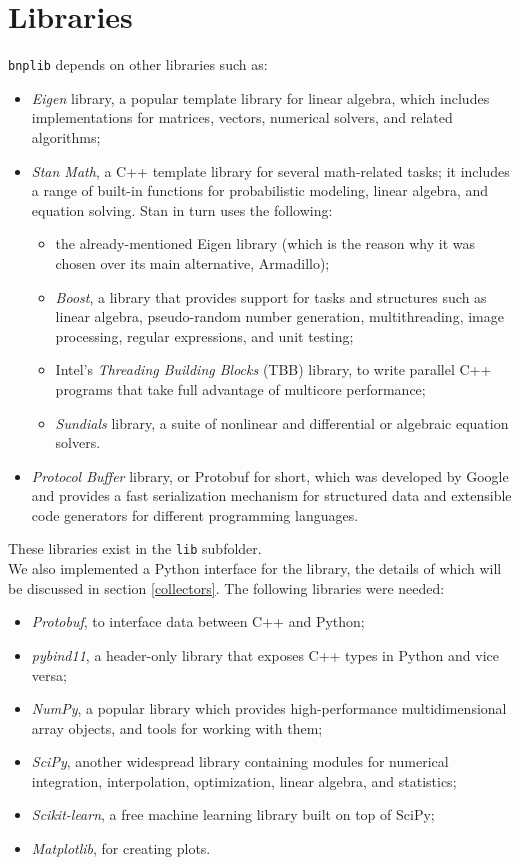 \section{Libraries}
\verb|bnplib| depends on other libraries such as:
\begin{itemize}
	\item \emph{Eigen} library, a popular template library for linear algebra, which includes implementations for matrices, vectors, numerical solvers, and related algorithms;
	\item \emph{Stan Math}, a C++ template library for several math-related tasks; it includes a range of built-in functions for probabilistic modeling, linear algebra, and equation solving.
	Stan in turn uses the following:
	\begin{itemize}
		\item the already-mentioned Eigen library (which is the reason why it was chosen over its main alternative, Armadillo);
		\item \emph{Boost}, a library that provides support for tasks and structures such as linear algebra, pseudo-random number generation, multithreading, image processing, regular expressions, and unit testing;
		\item Intel's \emph{Threading Building Blocks} (TBB) library, to write parallel C++ programs that take full advantage of multicore performance;
		\item \emph{Sundials} library, a suite of nonlinear and differential or algebraic equation solvers.
	\end{itemize}
	\item \emph{Protocol Buffer} library, or Protobuf for short, which was developed by Google and provides a fast serialization mechanism for structured data and extensible code generators for different programming languages.
\end{itemize}
These libraries exist in the \verb|lib| subfolder. \\
We also implemented a Python interface for the library, the details of which will be discussed in section \ref{collectors}.
The following libraries were needed:
\begin{itemize}
	\item \emph{Protobuf}, to interface data between C++ and Python;
	\item \emph{pybind11}, a header-only library that exposes C++ types in Python and vice versa;
	\item \emph{NumPy}, a popular library which provides high-performance multidimensional array objects, and tools for working with them;
	\item \emph{SciPy}, another widespread library containing modules for numerical integration, interpolation, optimization, linear algebra, and statistics;
	\item \emph{Scikit-learn}, a free machine learning library built on top of SciPy;
	\item \emph{Matplotlib}, for creating plots.
\end{itemize}
